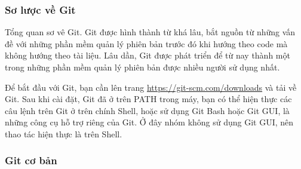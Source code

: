 \documentclass[12pt,a4paper]{report}
\begin{document}
            \subsubsection{Sơ lược về Git}
        Tổng quan sơ vê Git. Git được hình thành từ khá lâu, bắt nguồn từ những vấn đề với những phần mềm quản lý phiên bản trước đó khi hướng theo code mà không hướng theo tài liệu. Lâu dần, Git được phát triển để từ nay thành một trong những phần mềm quản lý phiên bản được nhiều người sử dụng nhất. \par
        Để bắt đầu với Git, bạn cần lên trang \url{https://git-scm.com/downloads} và tải về Git. Sau khi cài đặt, Git đã ở trên PATH trong máy, bạn có thể hiện thực các câu lệnh trên Git ở trên chính Shell, hoặc sử dụng Git Bash hoặc Git GUI, là những công cụ hỗ trợ riêng của Git. Ở đây nhóm không sử dụng Git GUI, nên thao tác hiện thực là trên Shell.\par

            \subsubsection{Git cơ bản}
\end{document}
